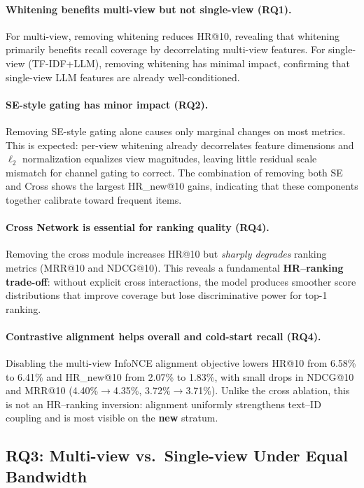 \documentclass[sigconf,natbib=true,anonymous]{acmart}
\begin{document}
\paragraph{Whitening benefits multi-view but not single-view (RQ1).}
For multi-view, removing whitening reduces HR@10, revealing
that whitening primarily benefits recall coverage by decorrelating
multi-view features. For single-view (TF-IDF+LLM), removing
whitening has minimal impact, confirming that single-view LLM
features are already well-conditioned.

\paragraph{SE-style gating has minor impact (RQ2).}
Removing SE-style gating alone causes only marginal changes on
most metrics. This is expected: per-view whitening already
decorrelates feature dimensions and $\ell_2$ normalization
equalizes view magnitudes, leaving little residual scale
mismatch for channel gating to correct.
The combination of removing both SE and Cross shows the largest
HR\_new@10 gains, indicating that these components together
calibrate toward frequent items.

\paragraph{Cross Network is essential for ranking quality (RQ4).}
Removing the cross module increases HR@10 but \emph{sharply degrades}
ranking metrics (MRR@10 and NDCG@10).
This reveals a fundamental \textbf{HR--ranking trade-off}: without
explicit cross interactions, the model produces smoother score
distributions that improve coverage but lose discriminative power
for top-1 ranking.

\paragraph{Contrastive alignment helps overall and cold-start recall (RQ4).}
Disabling the multi-view InfoNCE alignment objective lowers HR@10
from 6.58\% to 6.41\% and HR\_new@10 from 2.07\% to 1.83\%, with
small drops in NDCG@10 and MRR@10 (4.40\%$\rightarrow$4.35\%,
3.72\%$\rightarrow$3.71\%).
Unlike the cross ablation, this is not an HR--ranking inversion:
alignment uniformly strengthens text--ID coupling and is most
visible on the \textbf{new} stratum.

\subsection{RQ3: Multi-view vs.\ Single-view Under Equal Bandwidth}
\end{document}
